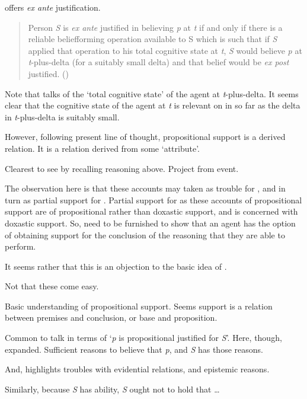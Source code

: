 \begin{note}
  \citeauthor{Goldman:1979ui} offers \emph{ex ante} justification.
  \begin{quote}
    Person \emph{S} is \emph{ex ante} justified in believing \emph{p} at \emph{t} if and only if there is a reliable beliefforming operation available to S which is such that if \emph{S} applied that operation to his total cognitive state at \emph{t}, \emph{S} would believe \emph{p} at \emph{t}-plus-delta (for a suitably small delta) and that belief would be \emph{ex post} justified.\nolinebreak
    \mbox{}\hfill\mbox{(\citeauthor[21]{Goldman:1979ui})}
  \end{quote}
  Note that \citeauthor{Goldman:1979ui} talks of the `total cognitive state' of the agent at \emph{t}-plus-delta.
  It seems clear that the cognitive state of the agent at \emph{t} is relevant on in so far as the delta in \emph{t}-plus-delta is suitably small.
\end{note}

\begin{note}[Example?]
  However, following present line of thought, propositional support is a derived relation.
  It is a relation derived from some `attribute'.

  Clearest to see by recalling reasoning above.
  Project from event.
\end{note}

\begin{note}
  The observation here is that these accounts may taken as trouble for \WR{}, and in turn as partial support for \AR{}.
  Partial support for \AR{} as these accounts of propositional support are of propositional rather than doxastic support, and \AR{} is concerned with doxastic support.
  So, need to be furnished to show that an agent has the option of obtaining support for the conclusion of the reasoning that they are able to perform.

  It seems rather that this is an objection to the basic idea of \WR{}.
\end{note}

\begin{note}
  Not that these come easy.

  Basic understanding of propositional support.
  Seems support is a relation between premises and conclusion, or base and proposition.

  Common to talk in terms of `\emph{p} is propositional justified for \emph{S}'.
  Here, though, expanded.
  Sufficient reasons to believe that \emph{p}, and \emph{S} has those reasons.

  And, \textcite{Silva:2020aa} highlights troubles with evidential relations, and epistemic reasons.

  Similarly, because \emph{S} has ability, \emph{S} ought not to hold that \dots
\end{note}

